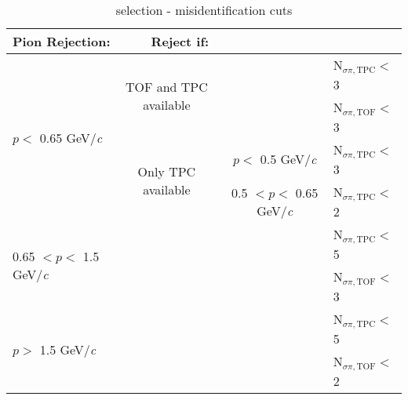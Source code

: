 \documentclass[/home/jesse/Analysis/FemtoAnalysis/AnalysisNotes/AnalysisNoteJBuxton.tex]{subfiles}
\begin{document}
\begin{landscape}
\begin{table}[htbp]
\begin{tabular}{lc|c|l}
   \multicolumn{4}{l}{Pion Rejection:~~~~~ Reject if:} \\
   \hline
   \multicolumn{1}{l|}{\multirow{4}{*}{$p <$ 0.65 GeV/\textit{c}}} & \multirow{2}{*}{TOF and TPC available} & \multicolumn{1}{c}{} & N$_{\sigma \pi,\mathrm{TPC}} <$ 3 \\
   \multicolumn{1}{c|}{} & \multicolumn{1}{c|}{} & \multicolumn{1}{c}{} & N$_{\sigma \pi,\mathrm{TOF}} <$ 3 \\
   \cline{2-4}
   \multicolumn{1}{c|}{\multirow{2}{*}{}} & \multicolumn{1}{c|}{\multirow{2}{*}{Only TPC available}} & $p <$ 0.5 GeV/\textit{c} & N$_{\sigma \pi,\mathrm{TPC}} <$ 3 \\
   \cline{3-4}
   \multicolumn{1}{c|}{} &  & 0.5 $< p <$ 0.65 GeV/\textit{c} & N$_{\sigma \pi,\mathrm{TPC}} <$ 2 \\
   \cline{1-4}
   \multicolumn{1}{l|}{\multirow{2}{*}{0.65 $< p <$ 1.5 GeV/\textit{c}}} & \multicolumn{2}{c}{} & N$_{\sigma \pi,\mathrm{TPC}} <$ 5 \\
   \multicolumn{1}{c|}{} & \multicolumn{2}{l}{} & N$_{\sigma \pi,\mathrm{TOF}} <$ 3 \\
   \cline{1-4}
   \multicolumn{1}{l|}{\multirow{2}{*}{$p >$ 1.5 GeV/\textit{c}}} & \multicolumn{2}{c}{} & N$_{\sigma \pi,\mathrm{TPC}} <$ 5 \\
   \multicolumn{1}{c|}{} & \multicolumn{2}{l}{} & N$_{\sigma \pi,\mathrm{TOF}} <$ 2 \\
   \hline
  \end{tabular}
 \caption[\Kpm selection - misidentification cuts]{\Kpm selection - misidentification cuts}
 \label{tab:KchCuts_MisID} 
\end{table}

\end{landscape} 
\end{document}
